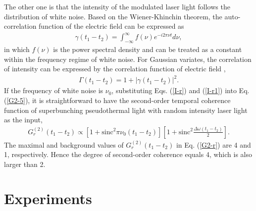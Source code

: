 \documentclass[12pt]{iopart}
\begin{document}
The other one is that the intensity of the modulated laser light follows the distribution of white noise. Based on the Wiener-Khinchin theorem, the auto-correlation function of the electric field can be expressed as \cite{goodman-s}
\begin{eqnarray}\label{I-r}
\gamma(t_1-t_2)=\int_{-\infty}^{\infty}f(\nu)e^{-i2\pi\nu t}d\nu,
\end{eqnarray}
in which $f(\nu)$ is the power spectral density and can be treated as a constant within the frequency regime of white noise. For Gaussian variates, the correlation of intensity can be expressed by the correlation function of electric field \cite{mandel-book},
\begin{eqnarray}\label{I-r1}
\Gamma(t_1-t_2)=1+|\gamma(t_1-t_2)|^2.
\end{eqnarray}
If the frequency of white noise is $\nu_0$, substituting Eqs. (\ref{I-r}) and (\ref{I-r1}) into Eq. (\ref{G2-5}), it is straightforward to have the second-order temporal coherence function of superbunching pseudothermal light with random intensity laser light as the input,
\begin{eqnarray}\label{G2-r}
G^{(2)}_r(t_1-t_2)\propto [1+\text{sinc}^2 \pi \nu_0(t_1-t_2)] [1+ \text{sinc}^2\frac{\Delta \omega (t_1-t_2)}{2}].
\end{eqnarray}
The maximal and background values of $G^{(2)}_r(t_1-t_2)$ in Eq. (\ref{G2-r}) are 4 and 1, respectively. Hence the degree of second-order coherence equals 4, which is also larger than 2.

\section{Experiments}
\end{document}

